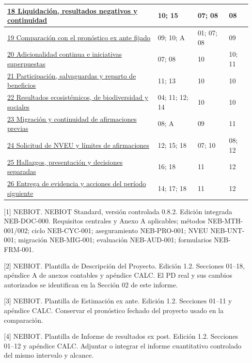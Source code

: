 {\begin{longtable}{@{}P{83mm}P{26mm}P{24mm}P{24mm}@{}}
\hyperref[mr:18]{18 Liquidación, resultados negativos y continuidad} & 10; 15 & 07; 08 & 08\\\hline
\hyperref[mr:19]{19 Comparación con el pronóstico ex ante fijado} & 09; 10; A & 01; 07; 08 & 09\\\hline
\hyperref[mr:20]{20 Adicionalidad continua e iniciativas superpuestas} & 07; 08 & 10 & 10; 11\\\hline
\hyperref[mr:21]{21 Participación, salvaguardas y reparto de beneficios} & 11; 13 & 10 & 10\\\hline
\hyperref[mr:22]{22 Resultados ecosistémicos, de biodiversidad y sociales} & 04; 11; 12; 14 & 10 & 10\\\hline
\hyperref[mr:23]{23 Migración y continuidad de afirmaciones previas} & 08; A & 09 & 11\\\hline
\hyperref[mr:24]{24 Solicitud de NVEU y límites de afirmaciones} & 12; 15; 18 & 07; 10 & 08; 12\\\hline
\hyperref[mr:25]{25 Hallazgos, presentación y decisiones separadas} & 16; 18 & 11 & 12\\\hline
\hyperref[mr:26]{26 Entrega de evidencia y acciones del período siguiente} & 14; 17; 18 & 11 & 12\\\hline
\end{longtable}}
[1] NEBIOT. NEBIOT Standard, versión controlada 0.8.2. Edición integrada NEB-DOC-000. Requisitos centrales y Anexo A aplicables; métodos NEB-MTH-001/002; ciclo NEB-CYC-001; aseguramiento NEB-PRO-001; NVEU NEB-UNT-001; migración NEB-MIG-001; evaluación NEB-AUD-001; formularios NEB-FRM-001.\par\vspace{2mm}
[2] NEBIOT. Plantilla de Descripción del Proyecto. Edición 1.2. Secciones 01–18, apéndice A de anexos contables y apéndice CALC. El PD real y sus cambios autorizados se identifican en la Sección 02 de este informe.\par\vspace{2mm}
[3] NEBIOT. Plantilla de Estimación ex ante. Edición 1.2. Secciones 01–11 y apéndice CALC. Conservar el pronóstico fechado del proyecto usado en la comparación.\par\vspace{2mm}
[4] NEBIOT. Plantilla de Informe de resultados ex post. Edición 1.2. Secciones 01–12 y apéndice CALC. Adjuntar o integrar el informe cuantitativo controlado del mismo intervalo y alcance.\par\vspace{2mm}

